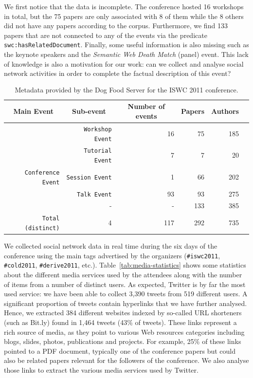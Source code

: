  We first notice that the data is incomplete. The conference hosted 16 workshops in total, but the 75 papers are only associated with 8 of them while the 8 others did not have any papers according to the corpus. Furthermore, we find 133 papers that are not connected to any of the events via the predicate \texttt{swc:hasRelatedDocument}. Finally, some useful information is also missing such as the keynote speakers and the \emph{Semantic Web Death Match} (panel) event. This lack of knowledge is also a motivation for our work: can we collect and analyse social network activities in order to complete the factual description of this event?

\begin{table}[htbp]
\footnotesize{
\begin{center}
\begin{tabular}{|r|r|r|r|r|r|}
\hline
\multicolumn{1}{|c}{\textbf{Main Event}} & \multicolumn{1}{|c}{\textbf{Sub-event}} & \multicolumn{1}{|c}{\textbf{Number of events}} & \multicolumn{1}{|c}{\textbf{Papers}} & \multicolumn{1}{|c|}{\textbf{Authors}}\\
\hline
& \texttt{Workshop Event} & 16 & 75 & 185\\
& \texttt{Tutorial Event} & 7 & 7 & 20\\
\texttt{Conference Event} & \texttt{Session Event} & 1 & 66 & 202\\
& \texttt{Talk Event} & 93 & 93 & 275\\
& - & - & 133 & 385\\
\hline
\texttt{Total (distinct)} & 4 & 117  & 292 & 735 \\
\hline
\end{tabular}
\vspace{1mm}
\caption{Metadata provided by the Dog Food Server for the ISWC 2011 conference.}
\label{tab:dataset-stats}
\end{center}}
\end{table}


We collected social network data in real time during the six days of the conference using the main tags advertised by the organizers (\texttt{\#iswc2011}, \texttt{\#cold2011}, \texttt{\#derive2011}, etc.). Table~\ref{tab:media-statistics} shows some statistics about the different media services used by the attendees along with the number of items from a number of distinct users. As expected, Twitter is by far the most used service: we have been able to collect 3,390 tweets from 519 different users. A significant proportion of tweets contain hyperlinks that we have further analysed. Hence, we extracted 384 different websites indexed by so-called URL shorteners (such as Bit.ly) found in 1,464 tweets (43\% of tweets). These links represent a rich source of media, as they point to various Web resources categories including blogs, slides, photos, publications and projects. For example, 25\% of these links pointed to a PDF document, typically  one of the conference papers but could also be related papers relevant for the followers of the conference. We also analyse those links to extract the various media services used by Twitter.

